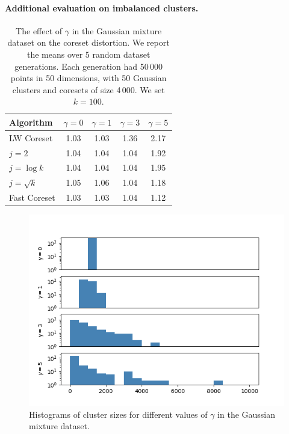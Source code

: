 \paragraph*{Additional evaluation on imbalanced clusters.}

\begin{table}[htbp]
    \label{tbl:class-imbalance}
    \centering
    \begin{tabular}{lcccc}
        Algorithm & $\gamma = 0$ & $\gamma = 1$ & $\gamma = 3$ & $\gamma = 5$\\
        \hline
        LW Coreset & 1.03 & 1.03 & 1.36 & 2.17\\
        $j=2$ & 1.04 & 1.04 & 1.04 & 1.92\\
        $j=\log k$ & 1.04 & 1.04 & 1.04 & 1.95\\
        $j=\sqrt{k}$ & 1.05 & 1.06 & 1.04 & 1.18\\
        Fast Coreset & 1.03 & 1.03 & 1.04 & 1.12
    \end{tabular}
    \caption{The effect of $\gamma$ in the Gaussian mixture dataset on the coreset distortion. We report the means over 5 random dataset generations.
    Each generation had 50\,000 points in 50 dimensions, with 50 Gaussian clusters and coresets of size 4\,000. We set $k=100$.}
\end{table}
\begin{figure}[htbp]
    \label{fig:effect-of-gamma}
    \centering
    \includegraphics[width=\linewidth]{images/effect_of_gamma.png}
    \caption{Histograms of cluster sizes for different values of $\gamma$ in the Gaussian mixture dataset.}
\end{figure}

